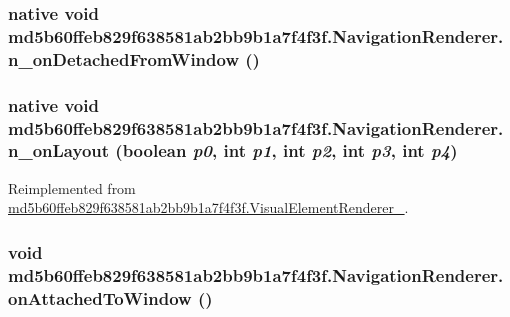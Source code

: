 \hypertarget{classmd5b60ffeb829f638581ab2bb9b1a7f4f3f_1_1_navigation_renderer_aae9bf07ad0aa59b17ac51722f2d0f2c}{
\subsubsection[{n\_\-onDetachedFromWindow}]{\setlength{\rightskip}{0pt plus 5cm}native void md5b60ffeb829f638581ab2bb9b1a7f4f3f.NavigationRenderer.n\_\-onDetachedFromWindow ()}}
\label{classmd5b60ffeb829f638581ab2bb9b1a7f4f3f_1_1_navigation_renderer_aae9bf07ad0aa59b17ac51722f2d0f2c}


\hypertarget{classmd5b60ffeb829f638581ab2bb9b1a7f4f3f_1_1_navigation_renderer_af33a2356cdc5ae5ab47a5c443433d3b}{
\subsubsection[{n\_\-onLayout}]{\setlength{\rightskip}{0pt plus 5cm}native void md5b60ffeb829f638581ab2bb9b1a7f4f3f.NavigationRenderer.n\_\-onLayout (boolean {\em p0}, \/  int {\em p1}, \/  int {\em p2}, \/  int {\em p3}, \/  int {\em p4})}}
\label{classmd5b60ffeb829f638581ab2bb9b1a7f4f3f_1_1_navigation_renderer_af33a2356cdc5ae5ab47a5c443433d3b}




Reimplemented from \hyperlink{classmd5b60ffeb829f638581ab2bb9b1a7f4f3f_1_1_visual_element_renderer__1_93658aeaafe1fbcb5301e4b9cbf9f833}{md5b60ffeb829f638581ab2bb9b1a7f4f3f.VisualElementRenderer\_}.\hypertarget{classmd5b60ffeb829f638581ab2bb9b1a7f4f3f_1_1_navigation_renderer_25d8c1e5ebe75b28d52ae09ac7bed4f6}{
\subsubsection[{onAttachedToWindow}]{\setlength{\rightskip}{0pt plus 5cm}void md5b60ffeb829f638581ab2bb9b1a7f4f3f.NavigationRenderer.onAttachedToWindow ()}}
\label{classmd5b60ffeb829f638581ab2bb9b1a7f4f3f_1_1_navigation_renderer_25d8c1e5ebe75b28d52ae09ac7bed4f6}


